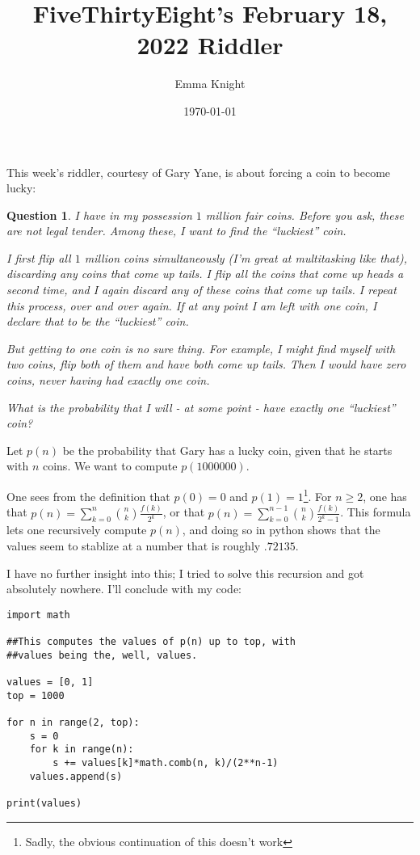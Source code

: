 \documentclass[11pt]{article}
\title{FiveThirtyEight's February 18, 2022 Riddler}
\author{Emma Knight}
\date{\today}
\newtheorem{question}[theorem]{Question}
\theoremstyle{definition}
\begin{document}
\maketitle

This week's riddler, courtesy of Gary Yane, is about forcing a coin to become lucky:
\begin{question}
I have in my possession $1$ million fair coins. Before you ask, these are not legal tender. Among these, I want to find the ``luckiest'' coin.

I first flip all $1$ million coins simultaneously (I'm great at multitasking like that), discarding any coins that come up tails. I flip all the coins that come up heads a second time, and I again discard any of these coins that come up tails. I repeat this process, over and over again. If at any point I am left with one coin, I declare that to be the ``luckiest'' coin.

But getting to one coin is no sure thing. For example, I might find myself with two coins, flip both of them and have both come up tails. Then I would have zero coins, never having had exactly one coin.

What is the probability that I will - at some point - have exactly one ``luckiest'' coin?
\end{question}
Let $p(n)$ be the probability that Gary has a lucky coin, given that he starts with $n$ coins.  We want to compute $p(1000000)$.

One sees from the definition that $p(0) = 0$ and $p(1) = 1$\footnote{Sadly, the obvious continuation of this doesn't work}.  For $n \geq 2$, one has that $p(n) = \displaystyle{\sum_{k = 0}^{n} \binom{n}{k}\frac{f(k)}{2^k}}$, or that $p(n) = \displaystyle{\sum_{k = 0}^{n-1} \binom{n}{k}\frac{f(k)}{2^k-1}}$.  This formula lets one recursively compute $p(n)$, and doing so in python shows that the values seem to stablize at a number that is roughly $.72135$.

I have no further insight into this; I tried to solve this recursion and got absolutely nowhere.  I'll conclude with my code:
\begin{verbatim}
import math

##This computes the values of p(n) up to top, with
##values being the, well, values.

values = [0, 1]
top = 1000

for n in range(2, top):
    s = 0
    for k in range(n):
        s += values[k]*math.comb(n, k)/(2**n-1)
    values.append(s)

print(values)
\end{verbatim}
\end{document}
